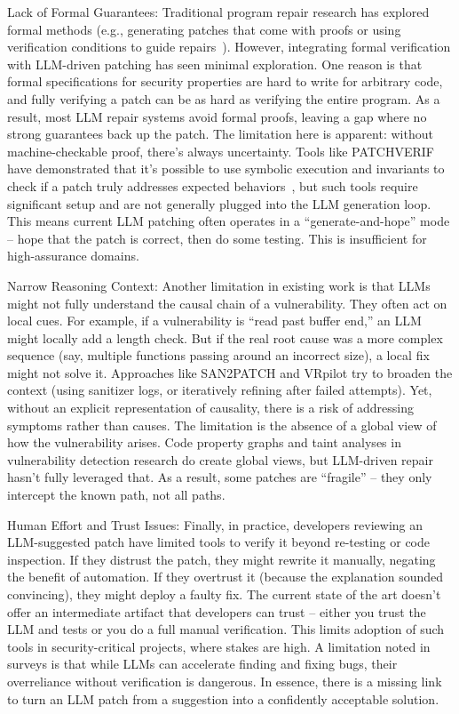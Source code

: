 \documentclass[conference,compsoc]{IEEEtran}
\begin{document}
Lack of Formal Guarantees: Traditional program repair research has
explored formal methods (e.g., generating patches that come with proofs
or using verification conditions to guide repairs~\cite{wang2024sok}). However,
integrating formal verification with LLM-driven patching has seen
minimal exploration. One reason is that formal specifications for
security properties are hard to write for arbitrary code, and fully
verifying a patch can be as hard as verifying the entire program. As a
result, most LLM repair systems avoid formal proofs, leaving a gap where
no strong guarantees back up the patch. The limitation here is apparent:
without machine-checkable proof, there's always uncertainty. Tools like
PATCHVERIF have demonstrated that it's possible to use symbolic
execution and invariants to check if a patch truly addresses expected
behaviors~\cite{wang2023patchverif}, but such tools require significant setup and are not
generally plugged into the LLM generation loop. This means current LLM
patching often operates in a ``generate-and-hope'' mode -- hope that the
patch is correct, then do some testing. This is insufficient for
high-assurance domains.

Narrow Reasoning Context: Another limitation in existing work is that
LLMs might not fully understand the causal chain of a vulnerability.
They often act on local cues. For example, if a vulnerability is ``read
past buffer end,'' an LLM might locally add a length check. But if the
real root cause was a more complex sequence (say, multiple functions
passing around an incorrect size), a local fix might not solve it.
Approaches like SAN2PATCH and VRpilot try to broaden the context (using
sanitizer logs, or iteratively refining after failed attempts). Yet,
without an explicit representation of causality, there is a risk of
addressing symptoms rather than causes. The limitation is the absence of
a global view of how the vulnerability arises. Code property graphs and
taint analyses in vulnerability detection research do create global
views, but LLM-driven repair hasn't fully leveraged that. As a result,
some patches are ``fragile'' -- they only intercept the known path, not
all paths.

Human Effort and Trust Issues: Finally, in practice, developers
reviewing an LLM-suggested patch have limited tools to verify it beyond
re-testing or code inspection. If they distrust the patch, they might
rewrite it manually, negating the benefit of automation. If they
overtrust it (because the explanation sounded convincing), they might
deploy a faulty fix. The current state of the art doesn't offer an
intermediate artifact that developers can trust -- either you trust the
LLM and tests or you do a full manual verification. This limits adoption
of such tools in security-critical projects, where stakes are high. A
limitation noted in surveys is that while LLMs can accelerate finding
and fixing bugs, their overreliance without verification is dangerous.
In essence, there is a missing link to turn an LLM patch from a
suggestion into a confidently acceptable solution.
\end{document}
